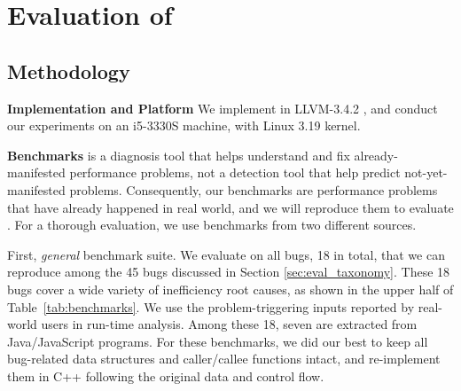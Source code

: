 \section{Evaluation of \Tool}
\label{sec:experiment}

\subsection{Methodology}
\label{sec:result_meth}



\noindent\textbf{Implementation and Platform}
We implement \Tool in LLVM-3.4.2 \cite{llvm}, and conduct our
experiments on an i5-3330S machine, with Linux 3.19 kernel. 

\noindent\textbf{Benchmarks}
\Tool is a diagnosis tool that helps understand and fix 
already-manifested performance problems,
not a detection tool that help predict not-yet-manifested
problems. Consequently, our benchmarks are performance problems that have already
happened in real world, and we will reproduce them to evaluate \Tool.
For a thorough evaluation, we use
benchmarks from two different sources.

First, \emph{general} benchmark suite.
We evaluate \Tool on all bugs, 18 in total, that we can reproduce 
among the 45 bugs discussed in Section \ref{sec:eval_taxonomy}. 
These 18 bugs cover a wide variety of inefficiency root causes, as 
shown in the upper half of Table~\ref{tab:benchmarks}. 
We use the problem-triggering inputs reported by real-world
users in \Tool run-time analysis.
Among these 18, seven are extracted from Java/JavaScript
programs.
For these benchmarks, we did our best to keep all bug-related data structures
and caller/callee functions intact, and re-implement them in C++
following the original data and control flow. 

